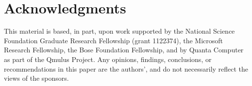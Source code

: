\documentclass{sigchi}
\begin{document}
\section{Acknowledgments}

This material is based, in part, upon work supported by the National Science Foundation Graduate Research Fellowship (grant 1122374), the Microsoft Research Fellowship, the Bose Foundation Fellowship, and by Quanta Computer as part of the Qmulus Project.  Any opinions, findings, conclusions, or recommendations in this paper are the authors', and do not necessarily reflect the views of the sponsors.

%
%
%
%
%
\balance




\end{document}
